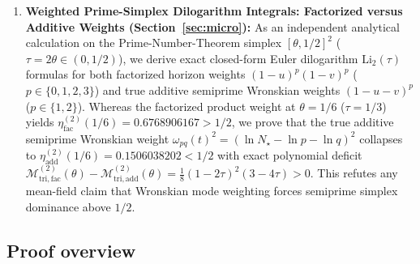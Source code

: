 \documentclass[11pt,reqno]{amsart}
\theoremstyle{definition}
\theoremstyle{remark}
\numberwithin{equation}{section}
\newcommand{\Li}{\mathrm{Li}}
\newcommand{\tri}{\mathrm{tri}}
\newcommand{\facw}{\mathrm{fac}}
\newcommand{\addw}{\mathrm{add}}
\begin{document}
\begin{enumerate}[label=(\roman*),leftmargin=2.2em]
\item \textbf{Weighted Prime-Simplex Dilogarithm Integrals: Factorized versus Additive Weights (Section~\ref{sec:micro}):} As an independent analytical calculation on the Prime-Number-Theorem simplex $[\theta,1/2]^2$ ($\tau = 2\theta \in (0,1/2)$), we derive exact closed-form Euler dilogarithm $\Li_2(\tau)$ formulas for both factorized horizon weights $(1-u)^p(1-v)^p$ ($p\in\{0,1,2,3\}$) and true additive semiprime Wronskian weights $(1-u-v)^p$ ($p\in\{1,2\}$). Whereas the factorized product weight at $\theta=1/6$ ($\tau=1/3$) yields $\eta_{\facw}^{(2)}(1/6) = 0.6768906167 > 1/2$, we prove that the true additive semiprime Wronskian weight $\omega_{pq}(t)^2 = (\ln N_\star - \ln p - \ln q)^2$ collapses to $\eta_{\addw}^{(2)}(1/6) = 0.1506038202 < 1/2$ with exact polynomial deficit $\mathcal{M}_{\tri,\facw}^{(2)}(\theta) - \mathcal{M}_{\tri,\addw}^{(2)}(\theta) = \frac{1}{8}(1-2\tau)^2(3-4\tau) > 0$. This refutes any mean-field claim that Wronskian mode weighting forces semiprime simplex dominance above $1/2$.
\end{enumerate}

\subsection{Proof overview}\label{subsec:proof-overview}
\end{document}
